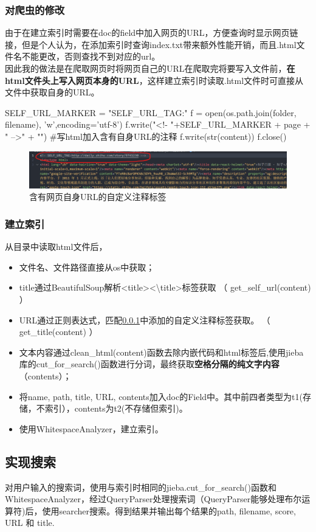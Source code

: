 \documentclass[12pt,a4paper]{article}
\begin{document}
\subsubsection{对爬虫的修改} \label{addhtml}
由于在建立索引时需要在doc的field中加入网页的URL，方便查询时显示网页链接，但是个人认为，在添加索引时查询index.txt带来额外性能开销，而且.html文件名不能更改，否则查找不到对应的url。
\\因此我的做法是在爬取网页时将网页自己的URL在爬取完将要写入文件前，\textbf{在html文件头上写入网页本身的URL}，这样建立索引时读取.html文件时可直接从文件中获取自身的URL。
\begin{python}
SELF_URL_MARKER  = "SELF_URL_TAG:"
f = open(os.path.join(folder, filename), 'w',encoding='utf-8')
f.write("<!- "+SELF_URL_MARKER + page + " -->" + "\n")  
#写html加入含有自身URL的注释
f.write(str(content))
f.close()
\end{python}
\begin{figure}[H]
	\includegraphics[width=\textwidth]{selftag.png}
	\centering
	 \caption{含有网页自身URL的自定义注释标签}
\end{figure}
\subsubsection{建立索引}
从目录中读取html文件后，
\begin{itemize}
\item 文件名、文件路径直接从os中获取；
\item title通过BeautifulSoup解析<title><\textbackslash title>标签获取  （ get{\_}self{\_}url(content) ）
\item URL通过正则表达式，匹配\ref{addhtml}中添加的自定义注释标签获取。 （ get{\_}title(content) ）
\item 文本内容通过clean{\_}html(content)函数去除内嵌代码和html标签后,使用jieba库的cut{\_}for{\_}search()函数进行分词，最终获取\textbf{空格分隔的纯文字内容}（contents）；
\item 将name, path, title, URL, contents加入doc的Field中。其中前四者类型为t1(存储，不索引），contents为t2(不存储但索引)。
\item 使用WhitespaceAnalyzer，建立索引。

\end{itemize}
\subsection{实现搜索}
对用户输入的搜索词，使用与索引时相同的jieba.cut{\_}for{\_}search()函数和WhitespaceAnalyzer，经过QueryParser处理搜索词（QueryParser能够处理布尔运算符)后，使用searcher搜索。得到结果并输出每个结果的path, filename, score, URL 和 title.
\end{document}

